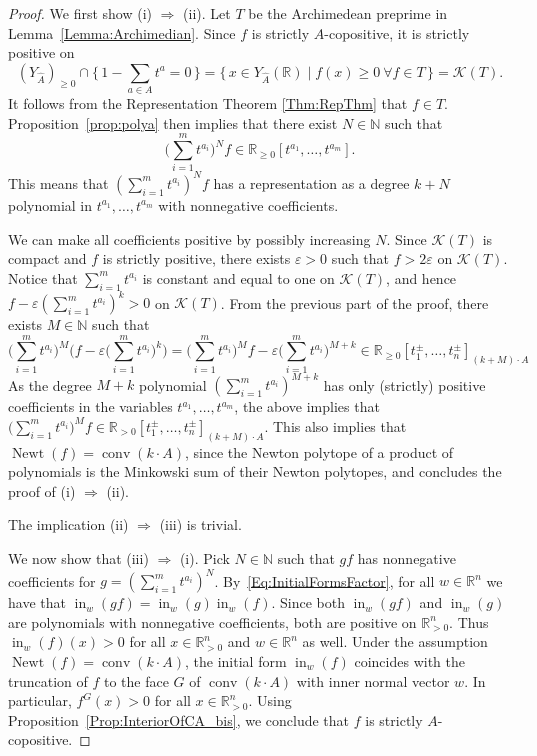 \documentclass[a4paper,11pt]{amsart}
\theoremstyle{definition}
\DeclareMathOperator{\initial}{in}
\DeclareMathOperator{\conv}{conv}
\DeclareMathOperator{\Newt}{Newt}
\newcommand{\NN}{\mathbb{N}}
\newcommand{\RR}{\mathbb{R}}
\begin{document}
\begin{proof}
We first show (i) $\Rightarrow$ (ii). Let $T$ be the Archimedean preprime in Lemma~\ref{Lemma:Archimedian}. Since $f$ is strictly $A$-copositive, it is strictly positive on \[(Y_{\hat{A}})_{\geq 0} \cap \{ \,1 - \sum_{a \in A} t^a =0\, \} = \{ \, x \in Y_{\hat{A}}(\RR) \mid f(x) \ge 0 \ \forall f \in T  \, \} = \mathcal{K}(T).\]
It follows from the Representation Theorem \ref{Thm:RepThm} that $f \in T$. Proposition~\ref{prop:polya} then implies that there exist $N \in \NN$ such that 
\[
    \big( \sum_{i=1}^m t^{a_i} \big)^N f \in \RR_{\ge 0}[t^{a_1},\ldots,t^{a_m}].
\]
This means that $( \sum_{i=1}^m t^{a_i} )^N f$ has a representation as a degree $k+N$ polynomial in $t^{a_1}, \dots , t^{a_m}$ with nonnegative coefficients.

We can make all coefficients positive {by possibly increasing $N$}. Since $\mathcal{K}(T)$ is compact and $f$ is strictly positive, there exists $\varepsilon > 0$ such that $f > 2\varepsilon$ on $\mathcal{K}(T)$. Notice that $\sum_{i=1}^m t^{a_i}$ is constant and equal to one on $\mathcal{K}(T)$, and hence $f - \varepsilon (\sum_{i=1}^m t^{a_i})^k > 0$ on $\mathcal{K}(T)$. From the previous part of the proof, there exists $M \in \NN$ such that
\[
    \big( \sum_{i=1}^m t^{a_i} \big)^M \big(f - \varepsilon \big(\sum_{i=1}^m t^{a_i}\big)^k\big) = \big( \sum_{i=1}^m t^{a_i} \big)^M f - \varepsilon \big( \sum_{i=1}^m t^{a_i} \big)^{M+k} \in \RR_{\ge 0}[t^{\pm}_1,\ldots,t_n^\pm]_{(k+M)\cdot A}
\]
As the degree $M+k$ polynomial $(\sum_{i=1}^m t^{a_i})^{M+k}$ has only (strictly) positive coefficients in the variables $t^{a_1}, \dots , t^{a_m}$, the above implies that $\big( \sum_{i=1}^m t^{a_i} \big)^M  f\in \RR_{> 0}[t^{\pm}_1,\ldots,t_n^\pm]_{(k+M)\cdot A}$.  This also implies that $\Newt(f) = \conv(k \cdot A)$, since the Newton polytope of a product of polynomials is the Minkowski sum of their Newton polytopes, and concludes the proof of (i) $\Rightarrow$ (ii).

The implication (ii) $\Rightarrow$ (iii) is trivial.

We now show that (iii) $\Rightarrow$ (i). Pick $N \in \mathbb{N}$ such that $g f$ has nonnegative coefficients for $g = (\sum_{i =1}^m t^{a_i})^N$. By~\eqref{Eq:InitialFormsFactor}, for all $w \in \mathbb{R}^n$ we have that $\initial_w ( g f  ) = \initial_w (g) \initial_w (f)$.
Since both $\initial_w ( g f  ) $ and $\initial_w ( g)$ are polynomials with nonnegative coefficients, both are positive on $\mathbb{R}^n_{>0}$. 
Thus $\initial_w(f)(x) > 0$ for all $x \in \mathbb{R}^n_{>0}$ and $w \in \mathbb{R}^n$ as well. Under the assumption $\Newt(f) = \conv(k \cdot A)$, the initial form $\initial_w(f)$ coincides with the truncation of $f$ to the face $G$ of $\conv(k\cdot A)$ with inner normal vector $w$. In particular, $f^{G}(x) > 0$ for all $x \in \mathbb{R}^n_{>0}$. Using Proposition~\ref{Prop:InteriorOfCA_bis}, we conclude that $f$ is strictly $A$-copositive. \end{proof}
\end{document}
